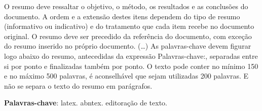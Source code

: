 \begin{resumo}
    O resumo deve ressaltar o objetivo, o método, os resultados e as conclusões
    do documento. A ordem e a extensão
    destes itens dependem do tipo de resumo (informativo ou indicativo) e do
    tratamento que cada item recebe no documento original. O resumo deve ser
    precedido da referência do documento, com exceção do resumo inserido no
    próprio documento. (\ldots) As palavras-chave devem figurar logo abaixo do
    resumo, antecedidas da expressão Palavras-chave:, separadas entre si por
    ponto e finalizadas também por ponto. O texto pode conter no mínimo 150 e
    no máximo 500 palavras, é aconselhável que sejam utilizadas 200 palavras.
    E não se separa o texto do resumo em parágrafos.

    \vspace{\onelineskip}

    \noindent
    \textbf{Palavras-chave}: latex. abntex. editoração de texto.
\end{resumo}
